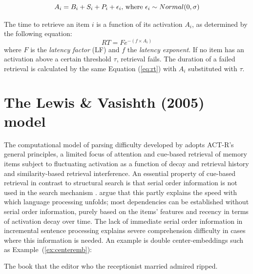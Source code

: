 \documentclass{cambridge7A}\usepackage[]{graphicx}\usepackage[]{color}
\begin{document}
\begin{equation}
  A_i = B_i + S_i + P_i + \epsilon_i  \hbox{, where } \epsilon_i \sim Normal(0,\sigma)  \label{eq:act}
\end{equation}

The time to retrieve an item $i$ is a function of its activation $A_i$, as determined by the following equation:
\begin{equation}\label{eq:rt}
	RT = Fe^{-(f\times A_i)}
\end{equation}
where $F$ is the  \textit{latency factor} (LF) and $f$ the \textit{latency exponent}. 
If no item has an activation above a certain threshold $\tau$, retrieval fails. The duration of a failed retrieval is calculated by the same Equation (\ref{eq:rt}) with $A_i$ substituted with $\tau$.

\section{The Lewis \& Vasishth (2005) model}
The  computational model of parsing difficulty developed by \cite{LewisVasishth2005} adopts ACT-R's general principles, a limited focus of attention and cue-based retrieval of memory items subject to fluctuating activation as a function of decay and retrieval history and similarity-based retrieval interference. An essential property of  cue-based retrieval in contrast to structural search is that  serial order information is not used in the search mechanism \citep{McElree2006,Ratcliff1978}. \cite{LewisVasishth2005} argue that this partly explains the speed with which  language processing unfolds;  most dependencies can be established without serial order information, purely based on the items' features and recency in terms of activation decay over time. The lack of immediate serial order information in incremental sentence processing  explains severe comprehension difficulty in cases where this information is needed. An example is double center-embeddings such as Example~(\ref{ex:centeremb}):

\begin{exe}
\ex \label{ex:centeremb}
The book that the editor who the receptionist married admired ripped.
\end{exe}  
%
\end{document}
